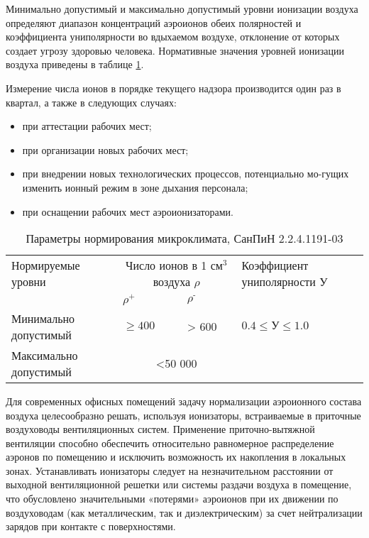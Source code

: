 Минимально допустимый и максимально допустимый уровни ионизации воздуха определяют диапазон концентраций аэроионов обеих полярностей и коэффициента униполярности во вдыхаемом воздухе, отклонение от которых создает угрозу здоровью человека. Нормативные значения уровней ионизации воздуха приведены в таблице \ref{tab:eco_ion}.

\clearpage
Измерение числа ионов в порядке текущего надзора производится один раз в квартал, а также в следующих случаях:
\begin{itemize}
	\item при аттестации рабочих мест;
	\item при организации новых рабочих мест;
	\item при внедрении новых технологических процессов, потенциально мо-гущих изменить ионный режим в зоне дыхания персонала;
	\item при оснащении рабочих мест аэроионизаторами.
\end{itemize}

\begin{table}[!h]
	\begin{center}
		\caption{Параметры нормирования микроклимата, СанПиН 2.2.4.1191-03}
		\begin{tabular}{|p{35mm}|p{27mm}|p{19mm}|p{35mm}|}
	\hline
	Нормируемые уровни & \multicolumn{2}{|c|}{Число ионов в 1 $\text{см}^3$ воздуха $\rho$ } & Коэффициент униполярности У \\
	\cline {2-3}
	& $\rho^\text{+}$ & $\rho^\text{-}$ &  \\ \hline
	Минимально допустимый & $\ge 400$ & > 600 &  $0.4 \le \text{У} \le 1.0 $ \\
	\cline {2-3}
	Максимально допустимый& \multicolumn{2}{|c|}{ <50 000 } &  \\ 
	\hline
		\end{tabular}
		\label{tab:eco_ion}
	\end{center}
\end{table}

Для современных офисных помещений задачу нормализации аэроионного состава воздуха целесообразно решать, используя ионизаторы, встраиваемые в приточные воздуховоды вентиляционных систем. Применение приточно-вытяжной вентиляции способно обеспечить относительно равномерное распределение аэронов по помещению и исключить возможность их накопления в локальных зонах. Устанавливать ионизаторы следует на незначительном расстоянии от выходной вентиляционной решетки или системы раздачи воздуха в помещение, что обусловлено значительными «потерями» аэроионов при их движении по воздуховодам (как металлическим, так и диэлектрическим) за счет нейтрализации зарядов при контакте с поверхностями.

